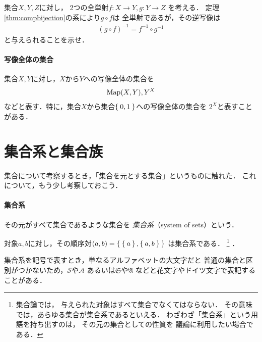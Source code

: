     \begin{que} \label{que:invcompgf}
      集合$X,  Y,  Z$に対し，
      2つの全単射$f:X \longrightarrow Y,  g: Y \longrightarrow Z$
      を考える．
      定理\ref{thm:compbijection}の系により$g \circ f$は
      全単射であるが，その逆写像は
      \begin{align}
        (g \circ f) ^{-1} = f^{-1} \circ g^{-1}
        \label{eq:invcompgf}
      \end{align}
      と与えられることを示せ．
    \end{que}  

    \paragraph{写像全体の集合}
    集合$X,  Y$に対し，$X$から$Y$への写像全体の集合を
    \begin{align}
      \mathop{\mathrm{Map}}\limits (X, Y) , Y^X
      \label{eq:mapsetmap}
    \end{align}
    などと表す．特に，集合$X$から集合$\Set{0,  1}$への写像全体の集合を
    $2^X$と表すことがある．

    
 \section{集合系と集合族}
 \label{sec:syuugouzoku}
%
   集合について考察するとき，「集合を元とする集合」というものに触れた．
   これについて，もう少し考察しておこう．
  
   \paragraph{集合系}
    その元がすべて集合であるような集合を
    \emph{集合系}（system of sets）という．
    \begin{ex} \label{systemsets}
      対象$a,  b$に対し，その順序対$(a,b)=\Set{ \Set{a} ,  \Set{a,  b}}$
      は集合系である．
      \footnote{
        集合論では，
        与えられた対象はすべて集合でなくてはならない．
        その意味では，あらゆる集合が集合系であるといえる．
        わざわざ「集合系」という用語を持ち出すのは，
        その元の集合としての性質を
        議論に利用したい場合である．
      }
      ．
    \end{ex}
    集合系を記号で表すとき，単なるアルファベットの大文字だと
    普通の集合と区別がつかないため，$\mathscr{S}$や$\mathscr{A}$
    あるいは$\mathfrak{S}$や$\mathfrak{A}$
    などと花文字やドイツ文字で表記することがある．

